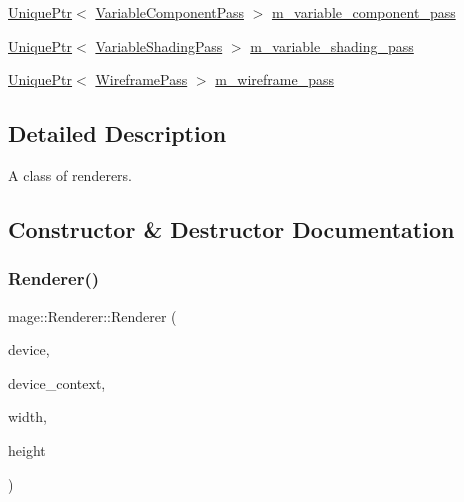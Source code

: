 \begin{DoxyCompactItemize}
\hyperlink{namespacemage_a3316d7143a973e37adf1110f2e80ca31}{Unique\+Ptr}$<$ \hyperlink{classmage_1_1_variable_component_pass}{Variable\+Component\+Pass} $>$ \hyperlink{classmage_1_1_renderer_a6016e73941650d3b88ef9ab9873548a6}{m\+\_\+variable\+\_\+component\+\_\+pass}
\item 
\hyperlink{namespacemage_a3316d7143a973e37adf1110f2e80ca31}{Unique\+Ptr}$<$ \hyperlink{classmage_1_1_variable_shading_pass}{Variable\+Shading\+Pass} $>$ \hyperlink{classmage_1_1_renderer_adb0d48e33a86c3ee481b26165e416487}{m\+\_\+variable\+\_\+shading\+\_\+pass}
\item 
\hyperlink{namespacemage_a3316d7143a973e37adf1110f2e80ca31}{Unique\+Ptr}$<$ \hyperlink{classmage_1_1_wireframe_pass}{Wireframe\+Pass} $>$ \hyperlink{classmage_1_1_renderer_a8c9f28228031337e26725af8213268ed}{m\+\_\+wireframe\+\_\+pass}
\end{DoxyCompactItemize}


\subsection{Detailed Description}
A class of renderers. 

\subsection{Constructor \& Destructor Documentation}
\hypertarget{classmage_1_1_renderer_a4efd88a30f3ad43cf5d490d62259f921}{}\label{classmage_1_1_renderer_a4efd88a30f3ad43cf5d490d62259f921} 
\subsubsection{\texorpdfstring{Renderer()}{Renderer()}\hspace{0.1cm}{\footnotesize\ttfamily [1/3]}}
{\footnotesize\ttfamily mage\+::\+Renderer\+::\+Renderer (\begin{DoxyParamCaption}\item[{I\+D3\+D11\+Device5 $\ast$}]{device,  }\item[{I\+D3\+D11\+Device\+Context4 $\ast$}]{device\+\_\+context,  }\item[{\hyperlink{namespacemage_a41c104c036fba3756a74e19f793eeaa1}{U32}}]{width,  }\item[{\hyperlink{namespacemage_a41c104c036fba3756a74e19f793eeaa1}{U32}}]{height }\end{DoxyParamCaption})\hspace{0.3cm}{\ttfamily [explicit]}}

